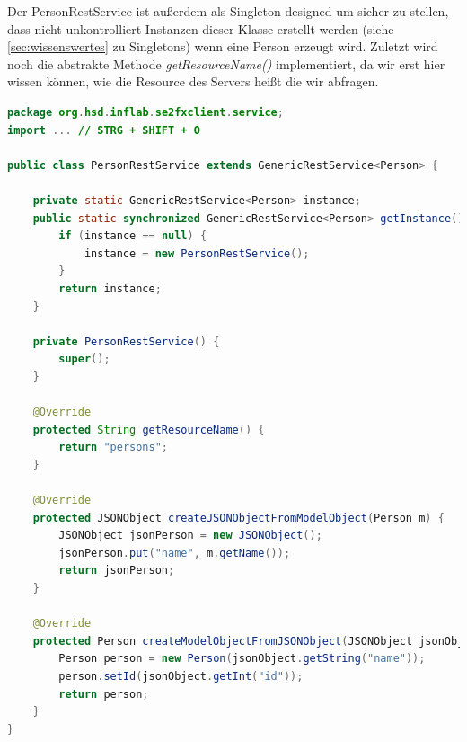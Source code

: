 \documentclass[11pt]{scrartcl}
\begin{document}
\newpage
Der PersonRestService ist außerdem als Singleton designed um sicher zu stellen,
dass nicht unkontrolliert Instanzen dieser Klasse erstellt werden 
(siehe \ref{sec:wissenswertes} zu Singletons) wenn eine Person erzeugt wird.
Zuletzt wird noch die abstrakte Methode \textit{getResourceName()} implementiert,
da wir erst hier wissen können, wie die Resource des Servers heißt die wir abfragen.
\begin{lstlisting}[language=java]
package org.hsd.inflab.se2fxclient.service;
import ... // STRG + SHIFT + O

public class PersonRestService extends GenericRestService<Person> {

    private static GenericRestService<Person> instance;    
    public static synchronized GenericRestService<Person> getInstance() {
        if (instance == null) {
            instance = new PersonRestService();
        }
        return instance;
    }
    
    private PersonRestService() {
        super();
    }

    @Override
    protected String getResourceName() {
        return "persons";
    }

    @Override
    protected JSONObject createJSONObjectFromModelObject(Person m) {
        JSONObject jsonPerson = new JSONObject();
        jsonPerson.put("name", m.getName());
        return jsonPerson;
    }

    @Override
    protected Person createModelObjectFromJSONObject(JSONObject jsonObject) {
        Person person = new Person(jsonObject.getString("name"));
        person.setId(jsonObject.getInt("id"));
        return person;
    }
}
\end{lstlisting}

\newpage
\end{document}
